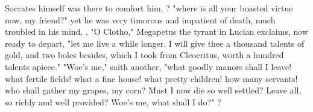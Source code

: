 Socrates himself was there to comfort him, ? "where is all your boasted virtue now, my friend?" yet he was very
timorous and impatient of death, much troubled in his mind, , \etc{} "O Clotho," Megapetus the tyrant in Lucian exclaims,
now ready to depart, "let me live a while longer. I will
give thee a thousand talents of gold, and two boles besides, which I took from
Cleocritus, worth a hundred talents apiece." "Woe's me,"
saith another, "what goodly manors shall I leave! what
fertile fields! what a fine house! what pretty children! how many servants! who
shall gather my grapes, my corn? Must I now die so well settled? Leave all, so
richly and well provided? Woe's me, what shall I do?"
?

